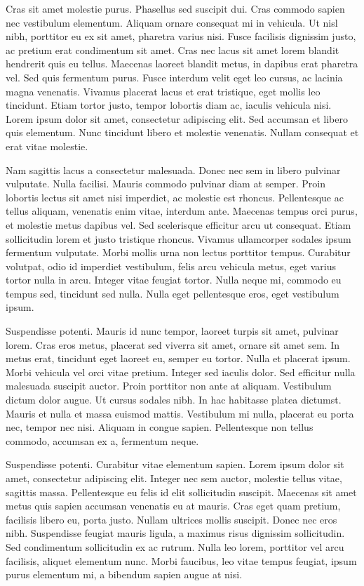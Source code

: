 \documentclass[a4paper,10pt,twoside]{article} %
\begin{document}
Cras sit amet molestie purus.
Phasellus sed suscipit dui.
Cras commodo sapien nec vestibulum elementum.
Aliquam ornare consequat mi in vehicula.
Ut nisl nibh, porttitor eu ex sit amet, pharetra varius nisi.
Fusce facilisis dignissim justo, ac pretium erat condimentum sit amet.
Cras nec lacus sit amet lorem blandit hendrerit quis eu tellus.
Maecenas laoreet blandit metus, in dapibus erat pharetra vel.
Sed quis fermentum purus.
Fusce interdum velit eget leo cursus, ac lacinia magna venenatis.
Vivamus placerat lacus et erat tristique, eget mollis leo tincidunt.
Etiam tortor justo, tempor lobortis diam ac, iaculis vehicula nisi.
Lorem ipsum dolor sit amet, consectetur adipiscing elit.
Sed accumsan et libero quis elementum.
Nunc tincidunt libero et molestie venenatis.
Nullam consequat et erat vitae molestie.

Nam sagittis lacus a consectetur malesuada.
Donec nec sem in libero pulvinar vulputate.
Nulla facilisi.
Mauris commodo pulvinar diam at semper.
Proin lobortis lectus sit amet nisi imperdiet, ac molestie est rhoncus.
Pellentesque ac tellus aliquam, venenatis enim vitae, interdum ante.
Maecenas tempus orci purus, et molestie metus dapibus vel.
Sed scelerisque efficitur arcu ut consequat.
Etiam sollicitudin lorem et justo tristique rhoncus.
Vivamus ullamcorper sodales ipsum fermentum vulputate.
Morbi mollis urna non lectus porttitor tempus.
Curabitur volutpat, odio id imperdiet vestibulum, felis arcu vehicula metus, eget varius tortor nulla in arcu.
Integer vitae feugiat tortor.
Nulla neque mi, commodo eu tempus sed, tincidunt sed nulla.
Nulla eget pellentesque eros, eget vestibulum ipsum.

Suspendisse potenti.
Mauris id nunc tempor, laoreet turpis sit amet, pulvinar lorem.
Cras eros metus, placerat sed viverra sit amet, ornare sit amet sem.
In metus erat, tincidunt eget laoreet eu, semper eu tortor.
Nulla et placerat ipsum.
Morbi vehicula vel orci vitae pretium.
Integer sed iaculis dolor.
Sed efficitur nulla malesuada suscipit auctor.
Proin porttitor non ante at aliquam.
Vestibulum dictum dolor augue.
Ut cursus sodales nibh.
In hac habitasse platea dictumst.
Mauris et nulla et massa euismod mattis.
Vestibulum mi nulla, placerat eu porta nec, tempor nec nisi.
Aliquam in congue sapien.
Pellentesque non tellus commodo, accumsan ex a, fermentum neque.

Suspendisse potenti.
Curabitur vitae elementum sapien.
Lorem ipsum dolor sit amet, consectetur adipiscing elit.
Integer nec sem auctor, molestie tellus vitae, sagittis massa.
Pellentesque eu felis id elit sollicitudin suscipit.
Maecenas sit amet metus quis sapien accumsan venenatis eu at mauris.
Cras eget quam pretium, facilisis libero eu, porta justo.
Nullam ultrices mollis suscipit.
Donec nec eros nibh.
Suspendisse feugiat mauris ligula, a maximus risus dignissim sollicitudin.
Sed condimentum sollicitudin ex ac rutrum.
Nulla leo lorem, porttitor vel arcu facilisis, aliquet elementum nunc.
Morbi faucibus, leo vitae tempus feugiat, ipsum purus elementum mi, a bibendum sapien augue at nisi.
\end{document}
